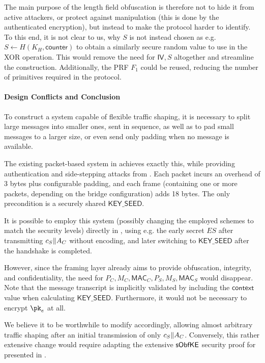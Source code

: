 The main purpose of the length field obfuscation is therefore not to hide it from active attackers, or protect against manipulation (this is done by the authenticated encryption), but instead to make the protocol harder to identify. To this end, it is not clear to us, why $S$ is not instead chosen as e.g. $S \gets H(K_H, \mathsf{counter})$ to obtain a similarly secure random value to use in the XOR operation. This would remove the need for $\mathsf{IV}, S$ altogether and streamline the construction. Additionally, the \drivel{} PRF $F_1$ could be reused, reducing the number of primitives required in the protocol.

\paragraph{Design Conflicts and Conclusion}

To construct a system capable of flexible traffic shaping, it is necessary to split large messages into smaller ones, sent in sequence, as well as to pad small messages to a larger size, or even send only padding when no message is available.

The existing packet-based system in \obfsfour{} achieves exactly this, while providing authentication and side-stepping attacks from \cite{SP:AlbPatWat09}. Each packet incurs an overhead of 3 bytes plus configurable padding, and each frame (containing one or more packets, depending on the bridge configuration) adds 18 bytes.
The only precondition is a securely shared $\mathsf{KEY\_SEED}$.

It is possible to employ this system (possibly changing the employed schemes to match 
the security levels) directly in \drivel{}, using e.g. the early secret $ES$ after transmitting $c_S \| A_C$ without encoding, and later switching to $\mathsf{KEY\_SEED}$ after the handshake is completed.

However, since the framing layer already aims to provide obfuscation, integrity, and confidentiality, the need for $P_C, M_C, \mathsf{MAC}_C, P_S, M_S, \mathsf{MAC}_S$ would disappear. Note that the message transcript is implicitly validated by including the $\mathsf{context}$ value when calculating $\mathsf{KEY\_SEED}$. Furthermore, it would not be necessary to encrypt $\pk_e$ at all.

We believe it to be worthwhile to modify \drivel{} accordingly, allowing almost arbitrary traffic shaping after an initial transmission of only $c_S \| A_C$.
Conversely, this rather extensive change would require adapting the extensive $\mathsf{sObfKE}$ security proof for \drivel{} presented in \cite{EPRINT:GRSV25}.


